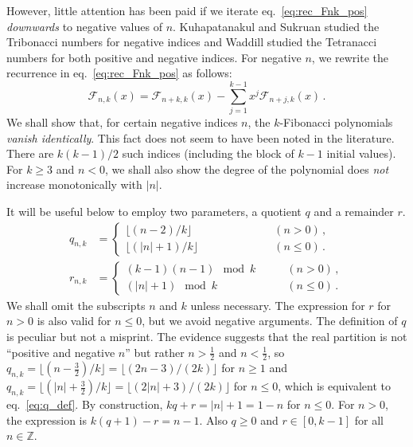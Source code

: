 \documentclass[review]{elsarticle}
\theoremstyle{plain}
\begin{document}
However, little attention has been paid if we iterate eq.~\eqref{eq:rec_Fnk_pos} \emph{downwards} to negative values of $n$.
Kuhapatanakul and Sukruan \cite{Kuhapatanakul_Sukruan} studied the Tribonacci numbers for negative indices
and Waddill \cite{Waddill} studied the Tetranacci numbers for both positive and negative indices.
For negative $n$, we rewrite the recurrence in eq.~\eqref{eq:rec_Fnk_pos} as follows:
\begin{equation}  
\label{eq:rec_Fnk_neg}
\mathcal{F}_{n,k}(x) = \mathcal{F}_{n+k,k}(x) -\sum_{j=1}^{k-1} x^j\mathcal{F}_{n+j,k}(x) \,.
\end{equation}
We shall show that, for certain negative indices $n$, the $k$-Fibonacci polynomials \emph{vanish identically}.
This fact does not seem to have been noted in the literature.
There are $k(k-1)/2$ such indices (including the block of $k-1$ initial values).
For $k\ge3$ and $n<0$, we shall also show the degree of the polynomial does \emph{not} increase monotonically with $|n|$.

It will be useful below to employ two parameters, a quotient $q$ and a remainder $r$.
\begin{subequations}
\label{eq:q_r_def}
\begin{align}
\label{eq:q_def}
q_{n,k} &= \begin{cases} \lfloor(n-2)/k\rfloor &\qquad\qquad\qquad (n>0) \,, \\
  \lfloor(|n|+1)/k\rfloor &\qquad\qquad\qquad (n\le0) \,. \end{cases}
\\
\label{eq:r_def}
r_{n,k} &= \begin{cases} (k-1)(n-1)\!\!\!\mod k &\qquad (n>0) \,, \\
  (|n|+1)\!\!\!\mod k &\qquad (n\le0) \,. \end{cases}
\end{align}
\end{subequations}
We shall omit the subscripts $n$ and $k$ unless necessary.
The expression for $r$ for $n>0$ is also valid for $n\le0$, but we avoid negative arguments.
The definition of $q$ is peculiar but not a misprint.
The evidence suggests that the real partition is not ``positive and negative $n$'' but rather $n>\frac12$ and $n<\frac12$,
so $q_{n,k}=\lfloor(n-\frac32)/k\rfloor=\lfloor(2n-3)/(2k)\rfloor$ for $n\ge1$
and $q_{n,k}=\lfloor(|n|+\frac32)/k\rfloor=\lfloor(2|n|+3)/(2k)\rfloor$ for $n\le0$,
which is equivalent to eq.~\eqref{eq:q_def}.
By construction, $kq+r = |n|+1 = 1-n$ for $n\le0$.
For $n>0$, the expression is $k(q+1)-r = n-1$.
Also $q\ge0$ and $r\in[0,k-1]$ for all $n\in\mathbb{Z}$.
\end{document}
